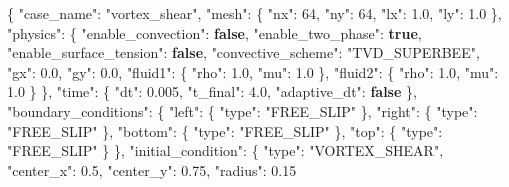 \documentclass[
  french,
]{article}
\newenvironment{Shaded}{}{}
\newcommand{\DataTypeTok}[1]{\textcolor[rgb]{0.56,0.13,0.00}{#1}}
\newcommand{\DecValTok}[1]{\textcolor[rgb]{0.25,0.63,0.44}{#1}}
\newcommand{\FloatTok}[1]{\textcolor[rgb]{0.25,0.63,0.44}{#1}}
\newcommand{\FunctionTok}[1]{\textcolor[rgb]{0.02,0.16,0.49}{#1}}
\newcommand{\KeywordTok}[1]{\textcolor[rgb]{0.00,0.44,0.13}{\textbf{#1}}}
\newcommand{\StringTok}[1]{\textcolor[rgb]{0.25,0.44,0.63}{#1}}
\begin{document}
\begin{Shaded}
\begin{Highlighting}[]
\FunctionTok{\{}
  \DataTypeTok{"case\_name"}\FunctionTok{:} \StringTok{"vortex\_shear"}\FunctionTok{,}
  \DataTypeTok{"mesh"}\FunctionTok{:} \FunctionTok{\{} \DataTypeTok{"nx"}\FunctionTok{:} \DecValTok{64}\FunctionTok{,} \DataTypeTok{"ny"}\FunctionTok{:} \DecValTok{64}\FunctionTok{,} \DataTypeTok{"lx"}\FunctionTok{:} \FloatTok{1.0}\FunctionTok{,} \DataTypeTok{"ly"}\FunctionTok{:} \FloatTok{1.0} \FunctionTok{\},}
  \DataTypeTok{"physics"}\FunctionTok{:} \FunctionTok{\{}
    \DataTypeTok{"enable\_convection"}\FunctionTok{:} \KeywordTok{false}\FunctionTok{,}
    \DataTypeTok{"enable\_two\_phase"}\FunctionTok{:} \KeywordTok{true}\FunctionTok{,}
    \DataTypeTok{"enable\_surface\_tension"}\FunctionTok{:} \KeywordTok{false}\FunctionTok{,}
    \DataTypeTok{"convective\_scheme"}\FunctionTok{:} \StringTok{"TVD\_SUPERBEE"}\FunctionTok{,}
    \DataTypeTok{"gx"}\FunctionTok{:} \FloatTok{0.0}\FunctionTok{,} \DataTypeTok{"gy"}\FunctionTok{:} \FloatTok{0.0}\FunctionTok{,}
    \DataTypeTok{"fluid1"}\FunctionTok{:} \FunctionTok{\{} \DataTypeTok{"rho"}\FunctionTok{:} \FloatTok{1.0}\FunctionTok{,} \DataTypeTok{"mu"}\FunctionTok{:} \FloatTok{1.0} \FunctionTok{\},}
    \DataTypeTok{"fluid2"}\FunctionTok{:} \FunctionTok{\{} \DataTypeTok{"rho"}\FunctionTok{:} \FloatTok{1.0}\FunctionTok{,} \DataTypeTok{"mu"}\FunctionTok{:} \FloatTok{1.0} \FunctionTok{\}}
  \FunctionTok{\},}
  \DataTypeTok{"time"}\FunctionTok{:} \FunctionTok{\{} \DataTypeTok{"dt"}\FunctionTok{:} \FloatTok{0.005}\FunctionTok{,} \DataTypeTok{"t\_final"}\FunctionTok{:} \FloatTok{4.0}\FunctionTok{,} \DataTypeTok{"adaptive\_dt"}\FunctionTok{:} \KeywordTok{false} \FunctionTok{\},}
  \DataTypeTok{"boundary\_conditions"}\FunctionTok{:} \FunctionTok{\{}
    \DataTypeTok{"left"}\FunctionTok{:}   \FunctionTok{\{} \DataTypeTok{"type"}\FunctionTok{:} \StringTok{"FREE\_SLIP"} \FunctionTok{\},}
    \DataTypeTok{"right"}\FunctionTok{:}  \FunctionTok{\{} \DataTypeTok{"type"}\FunctionTok{:} \StringTok{"FREE\_SLIP"} \FunctionTok{\},}
    \DataTypeTok{"bottom"}\FunctionTok{:} \FunctionTok{\{} \DataTypeTok{"type"}\FunctionTok{:} \StringTok{"FREE\_SLIP"} \FunctionTok{\},}
    \DataTypeTok{"top"}\FunctionTok{:}    \FunctionTok{\{} \DataTypeTok{"type"}\FunctionTok{:} \StringTok{"FREE\_SLIP"} \FunctionTok{\}}
  \FunctionTok{\},}
  \DataTypeTok{"initial\_condition"}\FunctionTok{:} \FunctionTok{\{}
    \DataTypeTok{"type"}\FunctionTok{:} \StringTok{"VORTEX\_SHEAR"}\FunctionTok{,}
    \DataTypeTok{"center\_x"}\FunctionTok{:} \FloatTok{0.5}\FunctionTok{,} \DataTypeTok{"center\_y"}\FunctionTok{:} \FloatTok{0.75}\FunctionTok{,} \DataTypeTok{"radius"}\FunctionTok{:} \FloatTok{0.15}

\end{Highlighting}
\end{Shaded}
\end{document}
